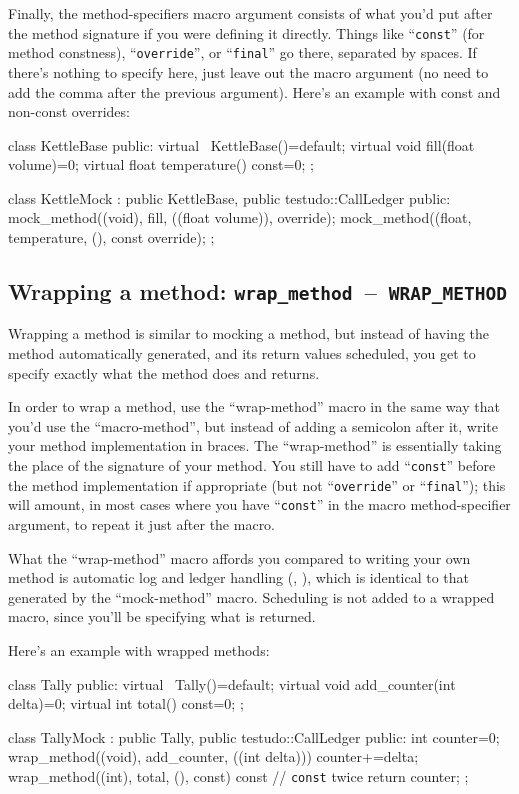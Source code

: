 \documentclass[twoside, a4paper, article]{memoir}
\newcommand*\testudocolor{\color{red!80!blue}}
\newcommand*\testudo[1]{\texttt{\testudocolor{}#1}}
\newcommand*\testudopair[2]{\testudo{#1}~--~\testudo{#2}}
\begin{document}
Finally, the method-specifiers macro argument consists of what you'd put after
the method signature if you were defining it directly.  Things like
``\texttt{const}'' (for method constness), ``\texttt{override}'', or
``\texttt{final}'' go there, separated by spaces.  If there's nothing to
specify here, just leave out the macro argument (no need to add the comma after
the previous argument).  Here's an example with const and non-const overrides:
\begin{cpplisting}
class KettleBase {
public:
  virtual ~KettleBase()=default;
  virtual void fill(float volume)=0;
  virtual float temperature() const=0;
};

class KettleMock
  : public KettleBase,
    public testudo::CallLedger {
public:
  mock_method((void), fill, ((float volume)), override);
  mock_method((float, temperature, (), const override);
};
\end{cpplisting}


\subsection{Wrapping a method: %
  \testudopair{wrap\_method}{WRAP\_METHOD}}
\label{sec:wrapping-method}

Wrapping a method is similar to mocking a method, but instead of having the
method automatically generated, and its return values scheduled, you get to
specify exactly what the method does and returns.

In order to wrap a method, use the ``wrap-method'' macro in the same way that
you'd use the ``macro-method'', but instead of adding a semicolon after it,
write your method implementation in braces.  The ``wrap-method'' is essentially
taking the place of the signature of your method.  You still have to add
``\texttt{const}'' before the method implementation if appropriate (but not
``\texttt{override}'' or ``\texttt{final}''); this will amount, in most cases
where you have ``\texttt{const}'' in the macro method-specifier argument, to
repeat it just after the macro.

What the ``wrap-method'' macro affords you compared to writing your own method
is automatic log and ledger handling (,
), which is identical to that generated by
the ``mock-method'' macro.  Scheduling is not added to a wrapped macro, since
you'll be specifying what is returned.

Here's an example with wrapped methods:
\begin{cpplisting}
class Tally {
public:
  virtual ~Tally()=default;
  virtual void add_counter(int delta)=0;
  virtual int total() const=0;
};

class TallyMock
  : public Tally, public testudo::CallLedger {
public:
  int counter=0;
  wrap_method((void), add_counter, ((int delta))) {
    counter+=delta;
  }
  wrap_method((int), total, (), const) const { // \texttt{const} twice
    return counter;
  }
};
\end{cpplisting}
\end{document}
